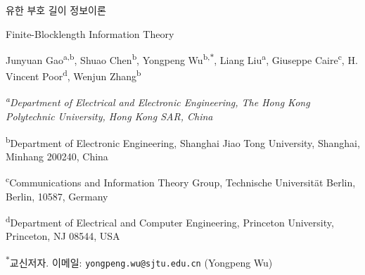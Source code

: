 \begin{center}
{\LARGE 유한 부호 길이 정보이론\par}
\vspace{0.4em}
{\large Finite-Blocklength Information Theory\par}
\vspace{1.2em}
Junyuan Gao\textsuperscript{a,b}, Shuao Chen\textsuperscript{b}, Yongpeng Wu\textsuperscript{b,$*$}, Liang Liu\textsuperscript{a}, Giuseppe Caire\textsuperscript{c}, H. Vincent Poor\textsuperscript{d}, Wenjun Zhang\textsuperscript{b}\par
\vspace{0.8em}
{\small\itshape
\textsuperscript{a}Department of Electrical and Electronic Engineering, The Hong Kong Polytechnic University, Hong Kong SAR, China\par
\textsuperscript{b}Department of Electronic Engineering, Shanghai Jiao Tong University, Shanghai, Minhang 200240, China\par
\textsuperscript{c}Communications and Information Theory Group, Technische Universität Berlin, Berlin, 10587, Germany\par
\textsuperscript{d}Department of Electrical and Computer Engineering, Princeton University, Princeton, NJ 08544, USA\par}
\vspace{0.6em}
{\small \textsuperscript{$*$}교신저자. 이메일: \texttt{yongpeng.wu@sjtu.edu.cn} (Yongpeng Wu)\par}
\end{center}

